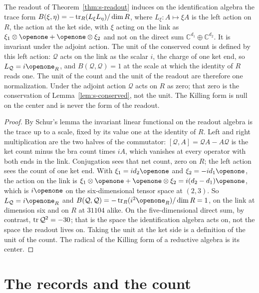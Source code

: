 \begin{lemma}
\label{lem:s-unit}
The readout of Theorem~\ref{thm:s-readout} induces on the identification algebra the trace form $B(\xi,\eta)=-\operatorname{tr}_{R}(L_{\xi}L_{\eta})/\dim R$, where $L_{\xi}:A\mapsto\xi A$ is the left action on $R$, the action at the ket side, with $\xi$ acting on the link as $\xi_{1}\otimes\openone+\openone\otimes\xi_{2}$ and not on the direct sum $\mathbb{C}^{d_{1}}\oplus\mathbb{C}^{d_{2}}$. It is invariant under the adjoint action. The unit of the conserved count is defined by this left action: $\mathcal{Q}$ acts on the link as the scalar $i$, the charge of one ket end, so $L_{\mathcal{Q}}=i\openone_{R}$, and $B(\mathcal{Q},\mathcal{Q})=1$ at the scale at which the identity of $R$ reads one. The unit of the count and the unit of the readout are therefore one normalization. Under the adjoint action $\mathcal{Q}$ acts on $R$ as zero; that zero is the conservation of Lemma~\ref{lem:s-conserved}, not the unit. The Killing form is null on the center and is never the form of the readout.
\end{lemma}
\begin{proof}
By Schur's lemma the invariant linear functional on the readout algebra is the trace up to a scale, fixed by its value one at the identity of $R$. Left and right multiplication are the two halves of the commutator: $[\mathcal{Q},A]=\mathcal{Q}A-A\mathcal{Q}$ is the ket count minus the bra count times $iA$, which vanishes at every operator with both ends in the link. Conjugation sees that net count, zero on $R$; the left action sees the count of one ket end. With $\xi_{1}=i d_{2}\openone$ and $\xi_{2}=-i d_{1}\openone$, the action on the link is $\xi_{1}\otimes\openone+\openone\otimes\xi_{2}=i(d_{2}-d_{1})\openone$, which is $i\openone$ on the six-dimensional tensor space at $(2,3)$. So $L_{\mathcal{Q}}=i\openone_{R}$ and $B(\mathcal{Q},\mathcal{Q})=-\tr_{R}(i^{2}\openone_{R})/\dim R=1$, on the link at dimension six and on $R$ at $31104$ alike. On the five-dimensional direct sum, by contrast, $\operatorname{tr}\mathcal{Q}^{2}=-30$; that is the space the identification algebra acts on, not the space the readout lives on. Taking the unit at the ket side is a definition of the unit of the count. The radical of the Killing form of a reductive algebra is its center.
\end{proof}

\section{The records and the count}
\label{sec:s-count}

